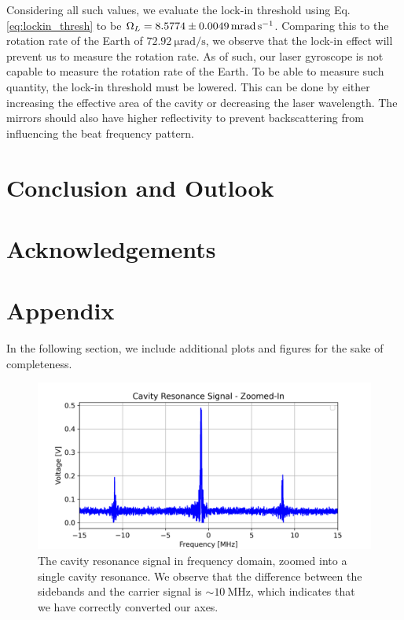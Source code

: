 \documentclass[a4paper]{report}
\numberwithin{equation}{section}
\begin{document}
Considering all such values, we evaluate the lock-in threshold using Eq. \ref{eq:lockin_thresh} to be $\Omega_L = \SI{8.5774 +- 0.0049}{\milli\radian\per\second}$. 
Comparing this to the rotation rate of the Earth of $\SI{72.92}{\micro\radian\per\second}$, we observe that the lock-in effect will 
prevent us to measure the rotation rate. As of such, our laser gyroscope is not capable to measure the rotation rate of the Earth. To be 
able to measure such quantity, the lock-in threshold must be lowered. This can be done by either increasing the effective area of 
the cavity or decreasing the laser wavelength. The mirrors should also have higher reflectivity to prevent backscattering 
from influencing the beat frequency pattern.\par 


\chapter{Conclusion and Outlook}

\chapter{Acknowledgements}

\printbibliography

\chapter{Appendix} \label{chap:appendix}

In the following section, we include additional plots and figures for the sake of completeness. 

\begin{figure}[h!]
	\centering
	\includegraphics[width=0.8\columnwidth]{res_peaks_freq_zoomed.png}
	\caption{The cavity resonance signal in frequency domain, zoomed into a single cavity resonance. We observe that 
	the difference between the sidebands and the carrier signal is $\sim \SI{10}{\mega\hertz}$, which indicates that we have
	correctly converted our axes.}
	\label{fig:res_peaks_zoomed}
\end{figure}
\end{document}
